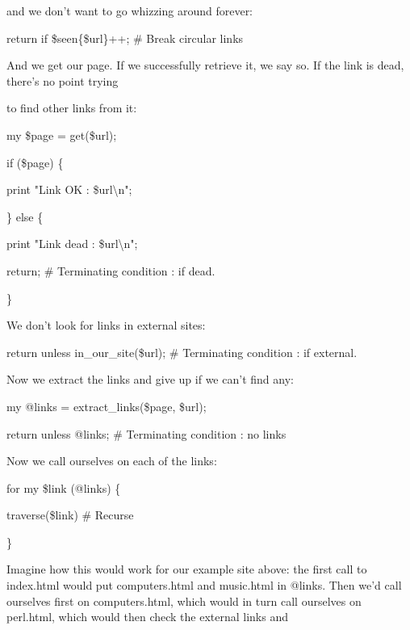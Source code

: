 \documentclass[a4paper,11pt]{book}
\begin{document}
\noindent and we don't want to go whizzing around forever:

\noindent 

\noindent return if \$seen\{\$url\}++; \# Break circular links

\noindent 

\noindent And we get our page. If we successfully retrieve it, we say so. If the link is dead, there's no point trying

\noindent to find other links from it:

\noindent 

\noindent my \$page = get(\$url);

\noindent if (\$page) \{

\noindent print "Link OK : \$url\textbackslash n";

\noindent \} else \{

\noindent print "Link dead : \$url\textbackslash n";

\noindent return; \# Terminating condition : if dead.

\noindent \}

\noindent 

\noindent We don't look for links in external sites:

\noindent 

\noindent return unless in\_our\_site(\$url); \# Terminating condition : if external.

\noindent 

\noindent Now we extract the links and give up if we can't find any:

\noindent 

\noindent my @links = extract\_links(\$page, \$url);

\noindent return unless @links; \# Terminating condition : no links

\noindent 

\noindent Now we call ourselves on each of the links:

\noindent 

\noindent for my \$link (@links) \{

\noindent traverse(\$link) \# Recurse

\noindent \}

\noindent 

\noindent Imagine how this would work for our example site above: the first call to index.html would put computers.html and music.html in @links. Then we'd call ourselves first on computers.html, which would in turn call ourselves on perl.html, which would then check the external links and
\end{document}
